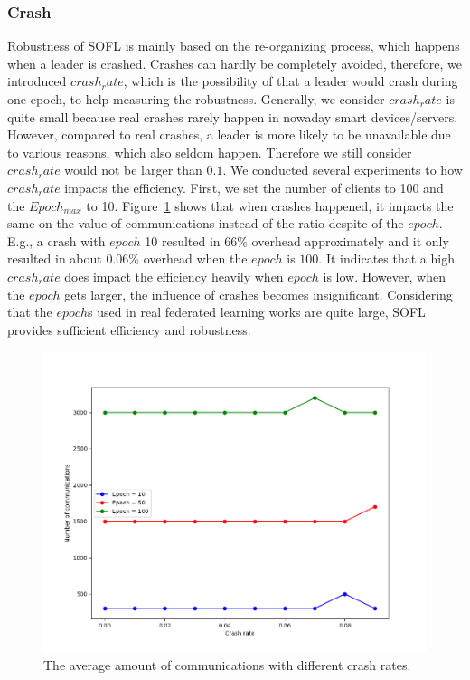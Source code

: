 \subsubsection{Crash}
Robustness of SOFL is mainly based on the re-organizing process, which happens when a leader is crashed. Crashes can hardly be completely avoided, therefore, we introduced $crash_rate$, which is the possibility of that a leader would crash during one epoch, to help measuring the robustness. Generally, we consider $crash_rate$ is quite small because real crashes rarely happen in nowaday smart devices/servers. However, compared to real crashes, a leader is more likely to be unavailable due to various reasons, which also seldom happen. Therefore we still consider $crash_rate$ would not be larger than $0.1$. We conducted several experiments to how $crash_rate$ impacts the efficiency. First, we set the number of clients to 100 and the $Epoch_{max}$ to 10. Figure~\ref{comm-crash} shows that when crashes happened, it impacts the same on the value of communications instead of the ratio despite of the $epoch$. E.g., a crash with $epoch$ 10 resulted in $66\%$ overhead approximately and it only resulted in about $0.06\%$ overhead when the $epoch$ is $100$. It indicates that a high $crash_rate$ does impact the efficiency heavily when $epoch$ is low. However, when the $epoch$ gets larger, the influence of crashes becomes insignificant. Considering that the $epoch$s used in real federated learning works are quite large, SOFL provides sufficient efficiency and robustness.

\begin{figure}[!ht]
    \centering
    \includegraphics[width=\columnwidth]{img/comm-crash.png}
    \caption{The average amount of communications with different crash rates.}
    \label{comm-crash}
\end{figure}

